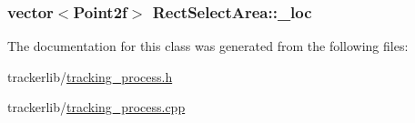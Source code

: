 \subsubsection[{\texorpdfstring{\+\_\+loc}{_loc}}]{\setlength{\rightskip}{0pt plus 5cm}vector$<$Point2f$>$ Rect\+Select\+Area\+::\+\_\+loc}\hypertarget{class_rect_select_area_a0fc2f938515d1507e4dfc75fcc2059f1}{}\label{class_rect_select_area_a0fc2f938515d1507e4dfc75fcc2059f1}


The documentation for this class was generated from the following files\+:\begin{DoxyCompactItemize}
\item 
trackerlib/\hyperlink{tracking__process_8h}{tracking\+\_\+process.\+h}\item 
trackerlib/\hyperlink{tracking__process_8cpp}{tracking\+\_\+process.\+cpp}\end{DoxyCompactItemize}
